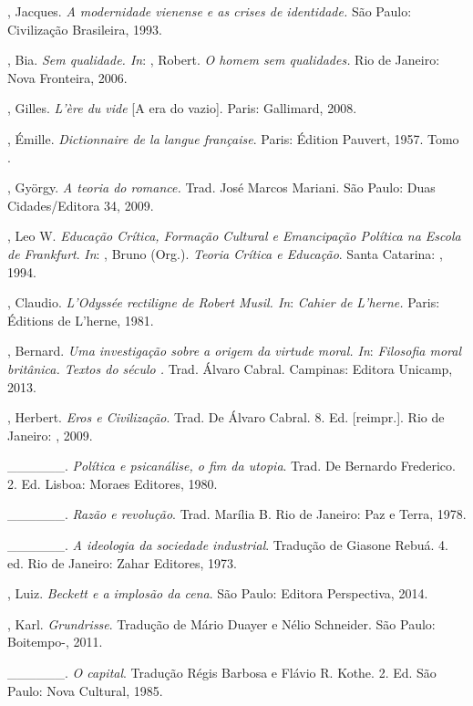 \begin{Parskip}
, Jacques. \emph{A modernidade vienense e as crises de
identidade.} São Paulo: Civilização Brasileira, 1993.

, Bia. \emph{Sem qualidade. In}: , Robert. \emph{O homem sem
qualidades.} Rio de Janeiro: Nova Fronteira, 2006.

, Gilles. \emph{L'ère du vide} [A era do vazio]. Paris:
Gallimard, 2008.

, Émille. \emph{Dictionnaire de la langue française}. Paris:
Édition Pauvert, 1957. Tomo .

, György. \emph{A teoria do romance.} Trad. José Marcos Mariani.
São Paulo: Duas Cidades/Editora 34, 2009.

, Leo W. \emph{Educação Crítica, Formação Cultural e Emancipação Política
na Escola de Frankfurt}. \emph{In}: , Bruno (Org.). \emph{Teoria Crítica
e Educação}. Santa Catarina: , 1994.

, Claudio. \emph{L'Odyssée rectiligne de Robert Musil. In}:
\emph{Cahier de L'herne.} Paris: Éditions de L'herne, 1981.

, Bernard. \emph{Uma investigação sobre a origem da virtude
moral. In}: \emph{Filosofia moral britânica. Textos do século .}
Trad. Álvaro Cabral. Campinas: Editora Unicamp, 2013.

, Herbert. \emph{Eros e Civilização}. Trad. De Álvaro Cabral.
8. Ed. [reimpr.]. Rio de Janeiro: , 2009.

\_\_\_\_\_\_. \emph{Política e psicanálise, o fim da utopia}. Trad. De
Bernardo Frederico. 2. Ed. Lisboa: Moraes Editores, 1980.

\_\_\_\_\_\_. \emph{Razão e revolução}. Trad. Marília B. Rio
de Janeiro: Paz e Terra, 1978.

\_\_\_\_\_\_. \emph{A ideologia da sociedade industrial}. Tradução de
Giasone Rebuá. 4. ed. Rio de Janeiro: Zahar Editores, 1973.

, Luiz. \emph{Beckett e a implosão da cena}. São Paulo: Editora
Perspectiva, 2014.

, Karl. \emph{Grundrisse}. Tradução de Mário Duayer e Nélio
Schneider. São Paulo: Boitempo-, 2011.

\_\_\_\_\_\_. \emph{O capital}. Tradução Régis Barbosa e Flávio R.
Kothe. 2. Ed. São Paulo: Nova Cultural, 1985.


\end{Parskip}
